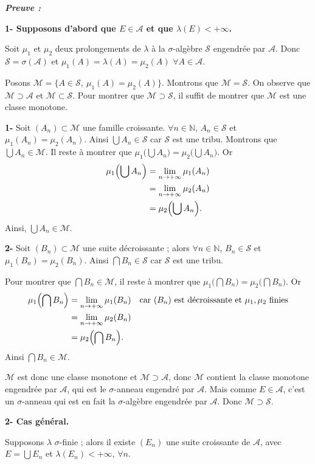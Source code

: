 \documentclass[11pt,a4paper]{article}
\newcommand{\N}{\mathbb{N}}
\newcommand{\A}{\mathscr{A}}
\newcommand{\M}{\mathscr{M}}
\newcommand{\Ss}{\mathscr{S}}
\newenvironment{preuve}{\par\textit{\textbf{Preuve :}}\par\nopagebreak[4]}{\par}
\begin{document}
\begin{preuve}
\textbf{1- Supposons d'abord que $E\in\A$ et que $\lambda(E)<+\infty$.}

Soit $\mu_1$ et $\mu_2$ deux prolongements de $\lambda$ à la $\sigma$-algèbre $\Ss$ engendrée par $\A$.
Donc $\Ss=\sigma(\A)$ et $\mu_1(A)=\lambda(A)=\mu_2(A)$ $\forall A\in\A$.

Posons $\M=\{A\in\Ss,\ \mu_1(A)=\mu_2(A)\}$. Montrons que $\M=\Ss$.
On observe que $\M\supset\A$ et $\M\subset\Ss$. Pour montrer que $\M\supset\Ss$, il suffit de montrer que $\M$ est une classe monotone.

\textbf{1-} Soit $(A_n)\subset\M$ une famille croissante. $\forall n\in\N$, $A_n\in\Ss$ et $\mu_1(A_n)=\mu_2(A_n)$.
Ainsi $\bigcup A_n\in\Ss$ car $\Ss$ est une tribu. Montrons que $\bigcup A_n\in\M$.
Il reste à montrer que $\mu_1\bigl(\bigcup A_n\bigr)=\mu_2\bigl(\bigcup A_n\bigr)$. Or
\begin{align*}
  \mu_1\Bigl(\bigcup A_n\Bigr)&=\lim_{n\to+\infty}\mu_1(A_n)\\
  &=\lim_{n\to+\infty}\mu_2(A_n)\\
  &=\mu_2\Bigl(\bigcup A_n\Bigr).
\end{align*}
Ainsi, $\bigcup A_n\in\M$.

\textbf{2-} Soit $(B_n)\subset\M$ une suite décroissante ; alors $\forall n\in\N$, $B_n\in\Ss$ et $\mu_1(B_n)=\mu_2(B_n)$.
Ainsi $\bigcap B_n\in\Ss$ car $\Ss$ est une tribu.

Pour montrer que $\bigcap B_n\in\M$, il reste à montrer que $\mu_1\bigl(\bigcap B_n\bigr)=\mu_2\bigl(\bigcap B_n\bigr)$. Or
\begin{align*}
  \mu_1\Bigl(\bigcap B_n\Bigr)&=\lim_{n\to+\infty}\mu_1(B_n)\quad\text{car }(B_n)\text{ est décroissante et }\mu_1,\mu_2\text{ finies}\\
  &=\lim_{n\to+\infty}\mu_2(B_n)\\
  &=\mu_2\Bigl(\bigcap B_n\Bigr).
\end{align*}
Ainsi $\bigcap B_n\in\M$.

$\M$ est donc une classe monotone et $\M\supset\A$, donc $\M$ contient la classe monotone engendrée par $\A$, qui est le $\sigma$-anneau engendré par $\A$.
Mais comme $E\in\A$, c'est un $\sigma$-anneau qui est en fait la $\sigma$-algèbre engendrée par $\A$. Donc $\M\supset\Ss$.

\medskip
\textbf{2- Cas général.}

Supposons $\lambda$ $\sigma$-finie ; alors il existe $(E_n)$ une suite croissante de $\A$, avec $E=\bigcup E_n$ et $\lambda(E_n)<+\infty$, $\forall n$.


\end{preuve}
\end{document}
